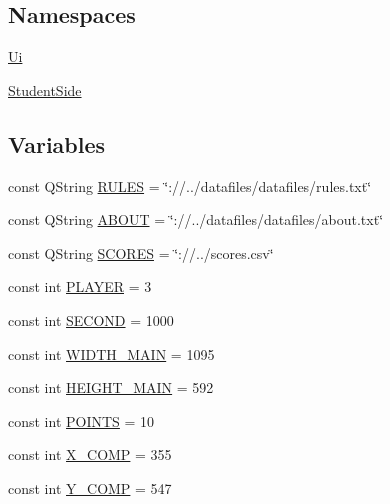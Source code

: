 \subsection*{Namespaces}
\begin{DoxyCompactItemize}
\item 
\hyperlink{namespace_ui}{Ui}
\item 
\hyperlink{namespace_student_side}{Student\-Side}
\end{DoxyCompactItemize}
\subsection*{Variables}
\begin{DoxyCompactItemize}
\item 
const Q\-String \hyperlink{mainwindow_8hh_afad7eb5ce267412e261321798f276542}{R\-U\-L\-E\-S} = \char`\"{}\-://../datafiles/datafiles/rules.\-txt\char`\"{}
\item 
const Q\-String \hyperlink{mainwindow_8hh_add086dddfd1041a943afc24d4fc5217e}{A\-B\-O\-U\-T} = \char`\"{}\-://../datafiles/datafiles/about.\-txt\char`\"{}
\item 
const Q\-String \hyperlink{mainwindow_8hh_a0012746528a3f7abc7de472e05a9e30c}{S\-C\-O\-R\-E\-S} = \char`\"{}\-://../scores.\-csv\char`\"{}
\item 
const int \hyperlink{mainwindow_8hh_ad18a55885568d3324c55bdefa31112ba}{P\-L\-A\-Y\-E\-R} = 3
\item 
const int \hyperlink{mainwindow_8hh_a50077804d4a057181d4f05a294a15ca1}{S\-E\-C\-O\-N\-D} = 1000
\item 
const int \hyperlink{mainwindow_8hh_a119c8f137ad0941c9930319665d01abb}{W\-I\-D\-T\-H\-\_\-\-M\-A\-I\-N} = 1095
\item 
const int \hyperlink{mainwindow_8hh_a8a9a3d327e245d16d8af8d57ac0428fc}{H\-E\-I\-G\-H\-T\-\_\-\-M\-A\-I\-N} = 592
\item 
const int \hyperlink{mainwindow_8hh_adf877364b47d0f0beade7967f248355c}{P\-O\-I\-N\-T\-S} = 10
\item 
const int \hyperlink{mainwindow_8hh_a01bc9f3900a2569418be75ff477c6462}{X\-\_\-\-C\-O\-M\-P} = 355
\item 
const int \hyperlink{mainwindow_8hh_a33040b291915efa0c17ff1a72a00a119}{Y\-\_\-\-C\-O\-M\-P} = 547
\end{DoxyCompactItemize}


